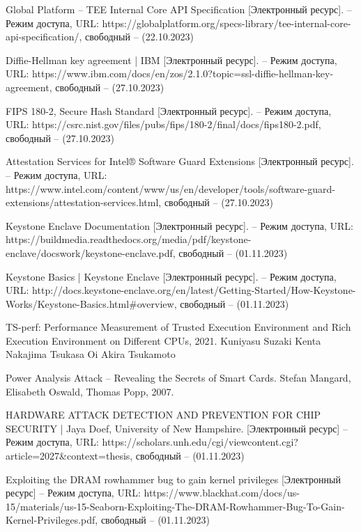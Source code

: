 \begin{thebibliography}{}
Global Platform -- TEE Internal Core API Specification [Электронный ресурс]. – Режим доступа, URL: https://globalplatform.org/specs-library/tee-internal-core-api-specification/, свободный – (22.10.2023)

Diffie-Hellman key agreement | IBM [Электронный ресурс]. – Режим доступа, URL: https://www.ibm.com/docs/en/zos/2.1.0?topic=ssl-diffie-hellman-key-agreement, свободный – (27.10.2023)

FIPS 180-2, Secure Hash Standard [Электронный ресурс]. – Режим доступа, URL: https://csrc.nist.gov/files/pubs/fips/180-2/final/docs/fips180-2.pdf, свободный – (27.10.2023)

Attestation Services for Intel® Software Guard Extensions [Электронный ресурс]. – Режим доступа, URL: https://www.intel.com/content/www/us/en/developer/tools/software-guard-extensions/attestation-services.html, свободный – (27.10.2023)

Keystone Enclave Documentation [Электронный ресурс]. – Режим доступа, URL: https://buildmedia.readthedocs.org/media/pdf/keystone-enclave/docswork/keystone-enclave.pdf, свободный – (01.11.2023)

Keystone Basics | Keystone Enclave [Электронный ресурс]. – Режим доступа, URL: http://docs.keystone-enclave.org/en/latest/Getting-Started/How-Keystone-Works/Keystone-Basics.html\#overview, свободный – (01.11.2023)

TS-perf: Performance Measurement of Trusted Execution Environment and Rich Execution Environment on Different CPUs, 2021. Kuniyasu Suzaki Kenta Nakajima Tsukasa Oi Akira Tsukamoto

Power Analysis Attack -- Revealing the Secrets of Smart Cards. Stefan Mangard, Elisabeth Oswald, Thomas Popp, 2007.

HARDWARE ATTACK DETECTION AND PREVENTION FOR CHIP SECURITY | Jaya Doef, University of New Hampshire. [Электронный ресурс] – Режим доступа, URL: https://scholars.unh.edu/cgi/viewcontent.cgi?article=2027\&context=thesis, свободный – (01.11.2023)

Exploiting the DRAM rowhammer bug to gain kernel privileges [Электронный ресурс] – Режим доступа, URL: https://www.blackhat.com/docs/us-15/materials/us-15-Seaborn-Exploiting-The-DRAM-Rowhammer-Bug-To-Gain-Kernel-Privileges.pdf, свободный – (01.11.2023)


\end{thebibliography}
